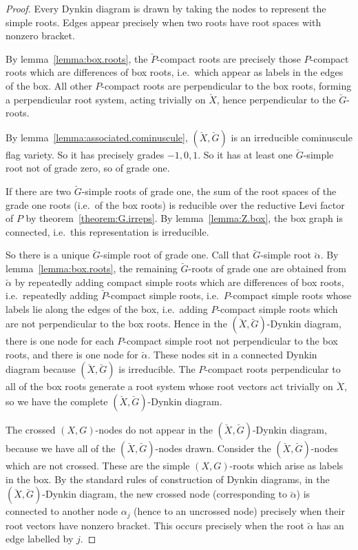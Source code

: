 \documentclass[a4paper,10pt]{amsart}
\theoremstyle{remark}
\begin{document}
\begin{proof}
Every Dynkin diagram is drawn by taking the nodes to represent the simple roots.
Edges appear precisely when two roots have root spaces with nonzero bracket.

By lemma~\vref{lemma:box.roots}, the \(\breve P\)-compact roots are precisely those \(P\)-compact roots which are differences of box roots, i.e.\ which appear as labels in the edges of the box.
All other \(P\)-compact roots are perpendicular to the box roots, forming a perpendicular root system, acting trivially on \(\breve X\), hence perpendicular to the \(\breve G\)-roots.

By lemma~\vref{lemma:associated.cominuscule}, \((\breve X,\breve G)\) is an irreducible cominuscule flag variety.
So it has precisely grades \(-1,0,1\).
So it has at least one \(\breve G\)-simple root not of grade zero, so of grade one.

If there are two \(\breve G\)-simple roots of grade one, the sum of the root spaces of the grade one roots (i.e.\ of the box roots) is reducible over the reductive Levi factor of \(P\) by theorem~\vref{theorem:G.irreps}.
By lemma~\vref{lemma:Z.box}, the box graph is connected, i.e.\ this representation is irreducible.

So there is a unique \(\breve G\)-simple root of grade one.
Call that \(\breve G\)-simple root \(\breve\alpha\).
By lemma~\vref{lemma:box.roots}, the remaining \(\breve G\)-roots of grade one are obtained from \(\breve\alpha\) by repeatedly adding compact simple roots which are differences of box roots, i.e.\ repeatedly adding \(\breve P\)-compact simple roots, i.e.\ \(P\)-compact simple roots whose labels lie along the edges of the box, i.e.\ adding \(P\)-compact simple roots which are not perpendicular to the box roots.
Hence in the \((\breve X,\breve G)\)-Dynkin diagram, there is one node for each \(P\)-compact simple root not perpendicular to the box roots, and there is one node for \(\breve\alpha\).
These nodes sit in a connected Dynkin diagram because \((\breve X,\breve G)\) is irreducible.
The \(P\)-compact roots perpendicular to all of the box roots generate a root system whose root vectors act trivially on \(\breve X\), so we have the complete \((\breve X,\breve G)\)-Dynkin diagram.

The crossed \((X,G)\)-nodes do not appear in the \((\breve X,\breve G)\)-Dynkin diagram, because we have all of the \((\breve X,\breve G)\)-nodes drawn.
Consider the \((\breve X,\breve G)\)-nodes which are not crossed.
These are the simple \((X,G)\)-roots which arise as labels in the box.
By the standard rules of construction of Dynkin diagrams, in the \((\breve X,\breve G)\)-Dynkin diagram, the new crossed node (corresponding to \(\breve\alpha\)) is connected to another node \(\alpha_j\) (hence to an uncrossed node) precisely when their root vectors have nonzero bracket.
This occurs precisely when the root \(\breve\alpha\) has an edge labelled by \(j\).
\end{proof}
\end{document}
